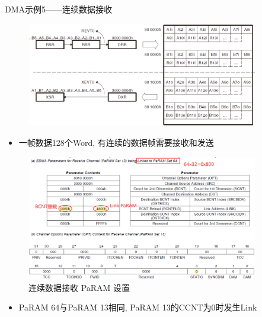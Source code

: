 \documentclass[10pt]{ctexbeamer}
\begin{document}
    \begin{frame}[allowframebreaks]{DMA示例5——连续数据接收}
        \begin{figure}
            \centering
            \includegraphics[width=0.9\textwidth]{summary/20.eps}
        \end{figure}
        \vspace{0.5cm}
        \begin{itemize}
            \item 一帧数据128个Word, 有连续的数据帧需要接收和发送
        \end{itemize}
        
        \begin{figure}
            \centering
            \includegraphics[width=0.9\textwidth]{summary/21.eps}
            \caption{连续数据接收 PaRAM 设置}
        \end{figure}
        \begin{itemize}
            \item PaRAM 64与PaRAM 13相同, PaRAM 13的CCNT为0时发生Link
        \end{itemize}
    \end{frame}
\end{document}
